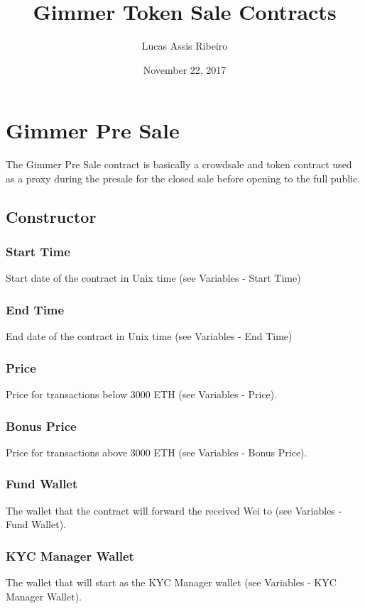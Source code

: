 \documentclass[11pt]{article} %
\title{Gimmer Token Sale Contracts}
\author{Lucas Assis Ribeiro}
\date{November 22, 2017} %
\begin{document}
\maketitle

\section {Gimmer Pre Sale}

The Gimmer Pre Sale contract is basically a crowdsale and token contract used as a proxy during the presale for the closed sale before opening to the full public.\\

\subsection{Constructor}
\subsubsection{Start Time}
Start date of the contract in Unix time (see Variables - Start Time)

\subsubsection{End Time}
End date of the contract in Unix time (see Variables - End Time)

\subsubsection{Price}
Price for transactions below 3000 ETH (see Variables - Price).

\subsubsection{Bonus Price}
Price for transactions above 3000 ETH (see Variables - Bonus Price).

\subsubsection{Fund Wallet}
The wallet that the contract will forward the received Wei to (see Variables - Fund Wallet).

\subsubsection{KYC Manager Wallet}
The wallet that will start as the KYC Manager wallet (see Variables - KYC Manager Wallet).
\end{document}
